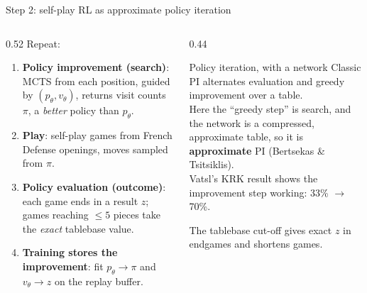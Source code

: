 \documentclass[aspectratio=169, 10pt]{beamer}
\begin{document}
\begin{frame}{Step 2: self-play RL as approximate policy iteration}
  \begin{columns}[T]
    \begin{column}{0.52\textwidth}
      Repeat:
      \begin{enumerate}
        \item \textbf{Policy improvement (search)}: MCTS from each position, guided by
          $(p_\theta, v_\theta)$, returns visit counts $\pi$, a \emph{better} policy than
          $p_\theta$.
        \item \textbf{Play}: self-play games from French Defense openings, moves sampled from
          $\pi$.
        \item \textbf{Policy evaluation (outcome)}: each game ends in a result $z$; games
          reaching $\le 5$ pieces take the \emph{exact} tablebase value.
        \item \textbf{Training stores the improvement}: fit $p_\theta \to \pi$ and
          $v_\theta \to z$ on the replay buffer.
      \end{enumerate}
    \end{column}
    \begin{column}{0.44\textwidth}
      \begin{block}{Policy iteration, with a network}
        \small
        Classic PI alternates evaluation and greedy improvement over a table.\\[3pt]
        Here the ``greedy step'' is search, and the network is a compressed, approximate
        table, so it is \textbf{approximate} PI (Bertsekas \& Tsitsiklis).\\[3pt]
        Vatsl's KRK result shows the improvement step working: 33\% $\to$ 70\%.
      \end{block}
      {\small The tablebase cut-off gives exact $z$ in endgames and shortens games.}
    \end{column}
  \end{columns}
\end{frame}
\end{document}
